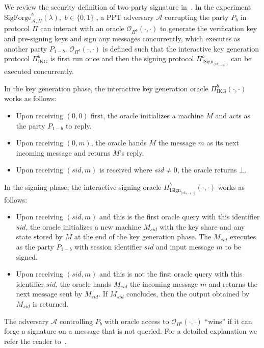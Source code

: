 \documentclass{llncs}
\begin{document}
We review the security definition of two-party signature in~\cite{Lin17,CCLST19}. In the experiment $\text{SigForge}^b_{\mathcal{A},\Pi}(\lambda)$,\ $b\in\{0,1\}$ , a PPT adversary $\mathcal{A}$ corrupting the party $P_b$ in protocol $\Pi$ can interact with an oracle $\mathcal{O}_{\Pi^b}(\cdot,\cdot)$ to generate the verification key and pre-signing keys and sign any messages concurrently, which executes as another party $P_{1-b}$. $\mathcal{O}_{\Pi^b}(\cdot,\cdot)$ is defined such that the interactive key generation protocol $\Pi^b_{\text{IKG}}$ is first run once and then the signing protocol $\Pi^b_{\text{ISign}_{\langle sk_{1-b},\cdot\rangle}}$ can be executed concurrently. 

In the key generation phase, the interactive key generation oracle $\Pi^b_{\text{IKG}}(\cdot,\cdot)$ works as follows: 
\begin{itemize}
\item Upon receiving $(0,0)$ first, the oracle initializes a machine $M$ and acts as the party $P_{1-b}$ to reply. 
\item Upon receiving $(0,m)$, the oracle hands $M$ the message $m$ as its next incoming message and returns $M$'s reply. 
\item Upon receiving $(sid,m)$ is received where $sid \not= 0$, the oracle returns $\bot$.
\end{itemize}

In the signing phase, the interactive signing oracle $\Pi^b_{\text{ISign}_{\langle sk_{1-b},\cdot\rangle}}(\cdot,\cdot)$ works as follows:
\begin{itemize}
\item Upon receiving $(sid,m)$ and this is the first oracle query with this identifier $sid$, the oracle initializes a new machine $M_{sid}$ with the key share and any state stored by $M$ at the end of the key generation phase. The $M_{sid}$ executes as the party $P_{1-b}$ with session identifier $sid$ and input message $m$ to be signed.  
\item Upon receiving  $(sid,m)$ and this is not the first oracle query with this identifier $sid$, the oracle hands $M_{sid}$ the incoming message $m$ and returns the next message sent by $M_{sid}$. If $M_{sid}$ concludes, then the output obtained by $M_{sid}$ is returned.
\end{itemize}

The adversary $\mathcal{A}$ controlling $P_b$ with oracle access to $\mathcal{O}_{\Pi^b}(\cdot,\cdot)$ ``wins'' if it can forge a signature on a message that is not queried. For a detailed explanation we refer the reader to~\cite{Lin17}. 
\end{document}

